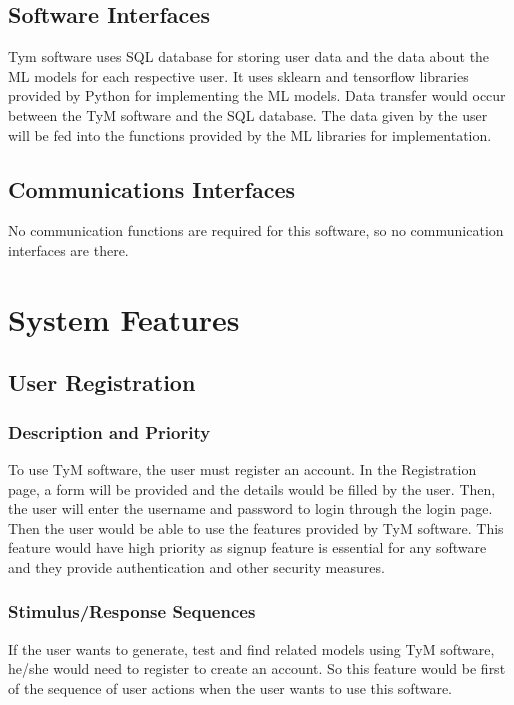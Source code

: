 \documentclass[12pt]{scrreprt}
\begin{document}
\section{Software Interfaces}
Tym software uses SQL database for storing user data and the data about the ML models for each respective user. It uses sklearn and tensorflow libraries provided by Python for implementing the ML models. Data transfer would occur between the TyM software and the SQL database. The data given by the user will be fed into the functions provided by the ML libraries for implementation. 

\section{Communications Interfaces}
No communication functions are required for this software, so no communication interfaces are there.


\chapter{System Features}


\section{User Registration}

\subsection{Description and Priority}
To use TyM software, the user must register an account. In the Registration page, a form will be provided and the details would be filled by the user. Then, the user will enter the username and password to login through the login page. Then the user would be able to use the features provided by TyM software. This feature would have high priority as signup feature is essential for any software and they provide authentication and other security measures.

\subsection{Stimulus/Response Sequences}
If the user wants to generate, test and find related models using TyM software, he/she would need to register to create an account. So this feature would be first of the sequence of user actions when the user wants to use this software.  
\end{document}

